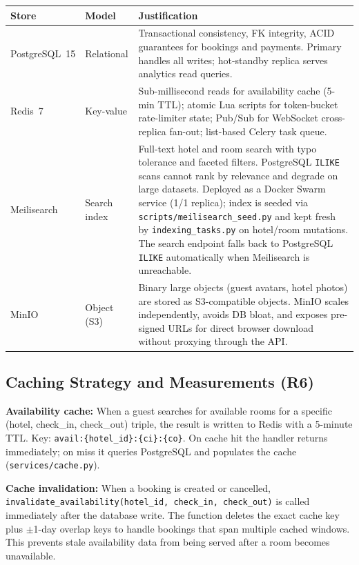 \documentclass[12pt,a4paper]{article}
\begin{document}
\begin{table}[H]
\centering\small
\begin{tabularx}{\linewidth}{@{} l l X @{}}
\toprule
\textbf{Store} & \textbf{Model} & \textbf{Justification} \\
\midrule
PostgreSQL~15  & Relational    & Transactional consistency, FK integrity, ACID guarantees for bookings and payments. Primary handles all writes; hot-standby replica serves analytics read queries. \\[3pt]
Redis~7        & Key-value     & Sub-millisecond reads for availability cache (5-min TTL); atomic Lua scripts for token-bucket rate-limiter state; Pub/Sub for WebSocket cross-replica fan-out; list-based Celery task queue. \\[3pt]
Meilisearch    & Search index  & Full-text hotel and room search with typo tolerance and faceted filters. PostgreSQL \texttt{ILIKE} scans cannot rank by relevance and degrade on large datasets. Deployed as a Docker Swarm service (1/1 replica); index is seeded via \texttt{scripts/meilisearch\_seed.py} and kept fresh by \texttt{indexing\_tasks.py} on hotel/room mutations. The search endpoint falls back to PostgreSQL \texttt{ILIKE} automatically when Meilisearch is unreachable. \\[3pt]
MinIO          & Object (S3)   & Binary large objects (guest avatars, hotel photos) are stored as S3-compatible objects. MinIO scales independently, avoids DB bloat, and exposes pre-signed URLs for direct browser download without proxying through the API. \\
\bottomrule
\end{tabularx}
\end{table}

\subsection{Caching Strategy and Measurements (R6)}

\textbf{Availability cache:} When a guest searches for available rooms for a specific (hotel, check\_in, check\_out) triple, the result is written to Redis with a 5-minute TTL. Key: \texttt{avail:\{hotel\_id\}:\{ci\}:\{co\}}. On cache hit the handler returns immediately; on miss it queries PostgreSQL and populates the cache (\texttt{services/cache.py}).

\textbf{Cache invalidation:} When a booking is created or cancelled, \texttt{invalidate\_availability(hotel\_id, check\_in, check\_out)} is called immediately after the database write. The function deletes the exact cache key plus $\pm$1-day overlap keys to handle bookings that span multiple cached windows. This prevents stale availability data from being served after a room becomes unavailable.
\end{document}
